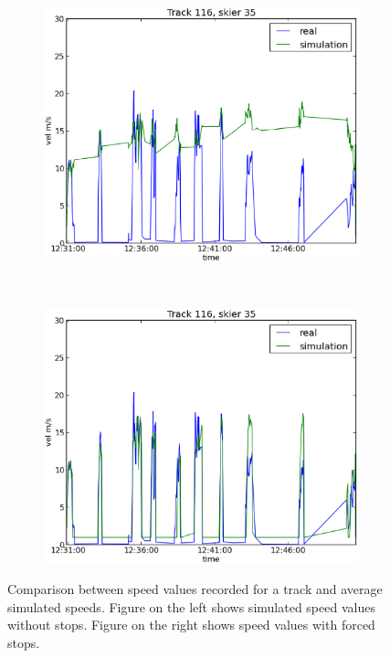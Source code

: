 \documentclass[12pt,a4paper,twoside]{book}
\begin{document}
\begin{figure}[!h]
        \begin{center}
        \begin{subfigure}[b]{0.5\textwidth}
                \centering
                \includegraphics[width=\textwidth]{images/sm_track116.eps}
        \end{subfigure}%
        ~ %
        \begin{subfigure}[b]{0.5\textwidth}
                \centering
                \includegraphics[width=\textwidth]{images/sm_stops_track116.eps}
        \end{subfigure}
        \caption{Comparison between speed values recorded for a track and average simulated speeds. Figure on the left shows simulated speed values without stops. Figure on the right shows speed values with forced stops.}\label{speeds}
        \end{center}
\end{figure}
\end{document}
